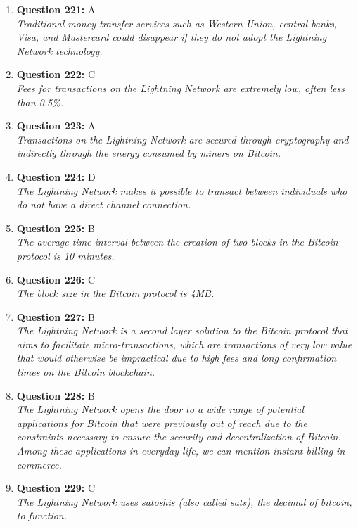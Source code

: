 \documentclass[12pt,a4paper]{article}
\begin{document}
\begin{enumerate}
\item \textbf{Question 221:} A
\\ \textit{Traditional money transfer services such as Western Union, central banks, Visa, and Mastercard could disappear if they do not adopt the Lightning Network technology.}

\item \textbf{Question 222:} C
\\ \textit{Fees for transactions on the Lightning Network are extremely low, often less than 0.5\%.}

\item \textbf{Question 223:} A
\\ \textit{Transactions on the Lightning Network are secured through cryptography and indirectly through the energy consumed by miners on Bitcoin.}

\item \textbf{Question 224:} D
\\ \textit{The Lightning Network makes it possible to transact between individuals who do not have a direct channel connection.}

\item \textbf{Question 225:} B
\\ \textit{The average time interval between the creation of two blocks in the Bitcoin protocol is 10 minutes.}

\item \textbf{Question 226:} C
\\ \textit{The block size in the Bitcoin protocol is 4MB.}

\item \textbf{Question 227:} B
\\ \textit{The Lightning Network is a second layer solution to the Bitcoin protocol that aims to facilitate micro-transactions, which are transactions of very low value that would otherwise be impractical due to high fees and long confirmation times on the Bitcoin blockchain.}

\item \textbf{Question 228:} B
\\ \textit{The Lightning Network opens the door to a wide range of potential applications for Bitcoin that were previously out of reach due to the constraints necessary to ensure the security and decentralization of Bitcoin. Among these applications in everyday life, we can mention instant billing in commerce.}

\item \textbf{Question 229:} C
\\ \textit{The Lightning Network uses satoshis (also called sats), the decimal of bitcoin, to function.}


\end{enumerate}
\end{document}
